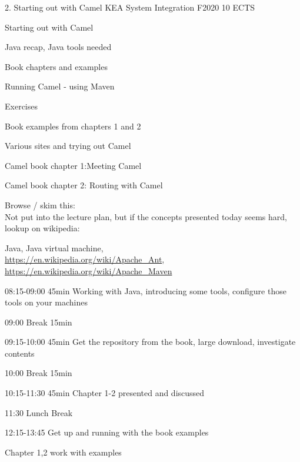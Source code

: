 \documentclass[Screen16to9,17pt]{foils}
\begin{document}
\mytitlepage
{2. Starting out with Camel}
{KEA System Integration F2020 10 ECTS}


Starting out with Camel
\begin{list2}
\item Java recap, Java tools needed
\item Book chapters and examples
\item Running Camel - using Maven
\end{list2}

Exercises
\begin{list2}
\item Book examples from chapters 1 and 2
\item Various sites and trying out Camel
\end{list2}




\begin{list1}
\item Camel book chapter 1:Meeting Camel
\item Camel book chapter 2: Routing with Camel
\item Browse / skim this:\\
Not put into the lecture plan, but if the concepts presented today seems hard, lookup on wikipedia:\\
\item Java, Java virtual machine,\\
 \url{https://en.wikipedia.org/wiki/Apache_Ant},\\ \url{https://en.wikipedia.org/wiki/Apache_Maven}
\end{list1}




\begin{list2}
\item 08:15-09:00 45min Working with Java, introducing some tools, configure those tools on your machines
\item 09:00 Break 15min
\item 09:15-10:00 45min Get the repository from the book, large download, investigate contents
\item 10:00 Break 15min
\item 10:15-11:30 45min Chapter 1-2 presented and discussed
\item 11:30 Lunch Break
\item 12:15-13:45 Get up and running with the book examples
\item Chapter 1,2 work with examples
\end{list2}
\end{document}
